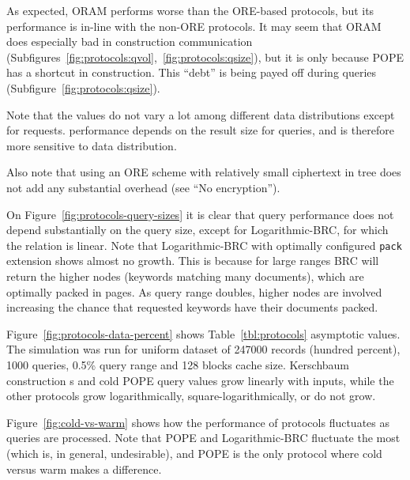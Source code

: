 			As expected, ORAM performs worse than the ORE-based protocols, but its performance is in-line with the non-ORE protocols.
			It may seem that ORAM does especially bad in construction communication (Subfigures~\ref{fig:protocols:qvol},~\ref{fig:protocols:qsize}), but it is only because POPE has a shortcut in construction.
			This ``debt'' is being payed off during queries (Subfigure~\ref{fig:protocols:qsize}).

			Note that the values do not vary a lot among different data distributions except for {\IO} requests.
			{\IO} performance depends on the result size for queries, and is therefore more sensitive to data distribution.

			Also note that using an ORE scheme with relatively small ciphertext in {\BPlus} tree does not add any substantial {\IO} overhead (see ``No encryption'').

			On Figure~\ref{fig:protocols-query-sizes} it is clear that query performance does not depend substantially on the query size, except for Logarithmic\hyp{}BRC, for which the relation is linear.
			Note that Logarithmic\hyp{}BRC with optimally configured \texttt{pack} extension shows almost no growth.
			This is because for large ranges BRC will return the higher nodes (keywords matching many documents), which are optimally packed in {\IO} pages.
			As query range doubles, higher nodes are involved increasing the chance that requested keywords have their documents packed.

			

			Figure~\ref{fig:protocols-data-percent} shows Table~\ref{tbl:protocols} asymptotic values.
			The simulation was run for uniform dataset of 247000 records (hundred percent), 1000 queries, 0.5\% query range and 128 blocks cache size.
			Kerschbaum construction {\IO}s and cold POPE query values grow linearly with inputs, while the other protocols grow logarithmically, square-logarithmically, or do not grow.

			Figure~\ref{fig:cold-vs-warm} shows how the performance of protocols fluctuates as queries are processed.
			Note that POPE and Logarithmic\hyp{}BRC fluctuate the most (which is, in general, undesirable), and POPE is the only protocol where cold versus warm makes a difference.
